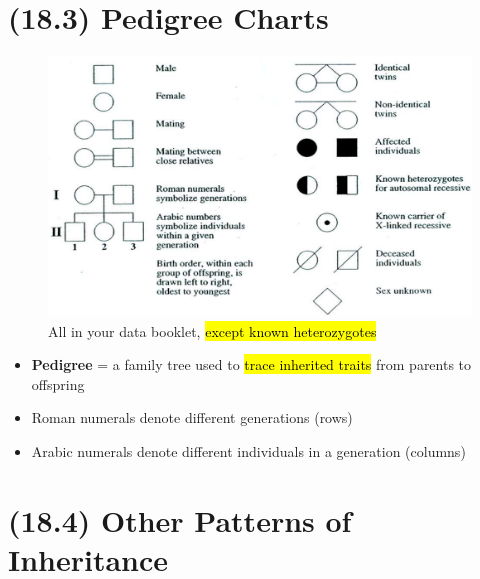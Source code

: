 \documentclass[a4paper,12pt]{article}
\begin{document}
\section{(18.3) Pedigree Charts}
\begin{figure}[H]
    \centering
    \includegraphics[width=\textwidth]{pedigree}
    \caption{All in your data booklet, \hl{except known heterozygotes}}
\end{figure}
\begin{itemize}
    \item{\textbf{Pedigree} = a family tree used to \hl{trace inherited traits} from parents to offspring}
    \item{Roman numerals denote different generations (rows)}
    \item{Arabic numerals denote different individuals in a generation (columns)}
\end{itemize}

\section{(18.4) Other Patterns of Inheritance}
\end{document}
